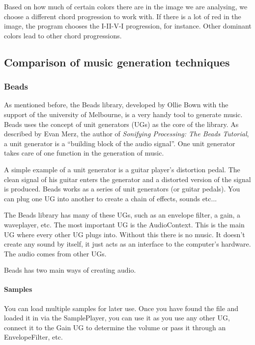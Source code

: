 \documentclass[12pt]{article}
\begin{document}
Based on how much of certain colors there are in the image we are analysing, we choose a different chord progression to work with. If there is a lot of red in the image, the program chooses the I-II-V-I progression, for instance. Other dominant colors lead to other chord progressions.

\subsection{Comparison of music generation techniques}

\subsubsection{Beads}
As mentioned before, the Beads library, developed by Ollie Bown with the support of the university of Melbourne, is a very handy tool to generate music. Beads uses the concept of unit generators (UGs) as the core of the library. As described by Evan Merz, the author of \textit{Sonifying Processing: The Beads Tutorial}, a unit generator is a ``building block of the audio signal''.  One unit generator takes care of one function in the generation of music. 
\newline

A simple example of a unit generator is a guitar player's distortion pedal. The clean signal of his guitar enters the generator and a distorted version of the signal is produced. Beads works as a series of unit generators (or guitar pedals). You can plug one UG into another to create a chain of effects, sounds etc... 
\newline

The Beads library has many of these UGs, such as an envelope filter, a gain, a waveplayer, etc. The most important UG is the AudioContext. This is the main UG where every other UG plugs into. Without this there is no music. It doesn't create any sound by itself, it just acts as an interface to the computer's hardware. The audio comes from other UGs.
\newline

Beads has two main ways of creating audio.

\paragraph{Samples}

You can load multiple samples for later use. Once you have found the file and loaded it in via the SamplePlayer, you can use it as you use any other UG, connect it to the Gain UG to determine the volume or pass it through an EnvelopeFilter, etc.  
\end{document}
